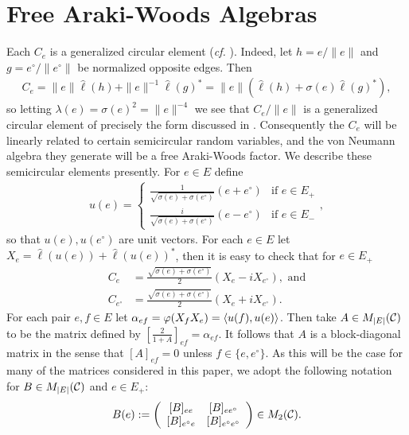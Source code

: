 
\section{Free Araki-Woods Algebras}

Each $C_e$ is a generalized circular element (\textit{cf.} \cite{Shl97}). Indeed, let $h=e/\|e\|$ and $g=e^\circ/\|e^\circ\|$ be normalized opposite edges. Then
\begin{align*}
C_e=\|e\| \hat{\ell}(h) + \|e\|^{-1} \hat{\ell}(g)^* = \|e\|( \hat{\ell}(h)+\sigma(e)\hat{\ell}(g)^*),
\end{align*}
so letting $\lambda(e)=\sigma(e)^2=\|e\|^{-4}$ we see that $C_e/\|e\|$ is a generalized circular element of precisely the form discussed in \cite{Shl97}. Consequently the $C_e$ will be linearly related to certain semicircular random variables, and the von Neumann algebra they generate will be a free Araki-Woods factor. We describe these semicircular elements presently. For $e\in E$ define
\begin{align*}
u(e)=\left\{\begin{array}{cl}	\frac{1}{\sqrt{\sigma(e)+\sigma(e^\circ)}} (e+e^\circ)	&	\text{if }e\in E_+\\
\frac{i}{\sqrt{\sigma(e)+\sigma(e^\circ)}} (e-e^\circ)	&	\text{if }e\in E_-\end{array}\right.,
\end{align*}
so that $u(e), u(e^\circ)$ are unit vectors. For each $e\in E$ let $X_e=\hat{\ell}(u(e))+\hat{\ell}(u(e))^*$, then it is easy to check that for $e\in E_+$
\begin{align}\label{linear_relation0}
	C_e &= \frac{\sqrt{\sigma(e)+\sigma(e^\circ)}}{2}\left(X_e-i X_{e^\circ}\right),\text{ and}\\
	C_{e^\circ} &= \frac{\sqrt{\sigma(e)+\sigma(e^\circ)}}{2}\left(X_e + i X_{e^\circ}\right).\nonumber
\end{align}
For each pair $e,f\in E$ let $\alpha_{ef}=\varphi(X_fX_e)=\left\langle u(f),u(e)\right\rangle$. Then take $A\in M_{|E|}(\mathcal C)$ to be the matrix defined by $\left[\frac{2}{1+A}\right]_{ef}=\alpha_{ef}$. It follows that $A$ is a block-diagonal matrix in the sense that $[A]_{ef}=0$ unless $f\in \{e,e^\circ\}$. As this will be the case for many of the matrices considered in this paper, we adopt the following notation for $B\in M_{|E|}(\mathcal C)$ and $e\in E_+$:
\begin{align*}
B(e):=\left(\begin{array}{cc} [B]_{ee} & [B]_{ee^\circ}\\ {[B]_{e^\circ e}} & [B]_{e^\circ e^\circ}\end{array}\right) \in M_2(\mathcal C).
\end{align*}
